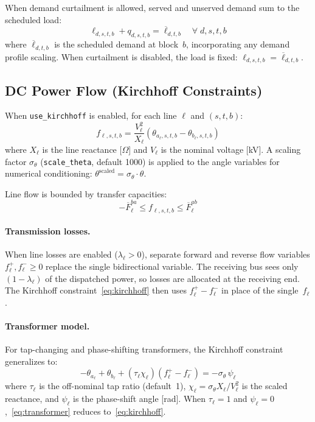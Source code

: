 When demand curtailment is allowed, served and unserved demand sum to the
scheduled load:
\begin{equation}
\label{eq:demand_balance}
\ell_{d,s,t,b} + q_{d,s,t,b} = \overline{\ell}_{d,t,b}
\quad \forall\; d, s, t, b
\end{equation}
where $\overline{\ell}_{d,t,b}$ is the scheduled demand at block~$b$,
incorporating any demand profile scaling.  When curtailment is disabled,
the load is fixed: $\ell_{d,s,t,b} = \overline{\ell}_{d,t,b}$.

\subsection{DC Power Flow (Kirchhoff Constraints)}

When \texttt{use\_kirchhoff} is enabled, for each line $\ell$ and
$(s,t,b)$:
\begin{equation}
\label{eq:kirchhoff}
f_{\ell,s,t,b} = \frac{V_\ell^2}{X_\ell}
  \left(\theta_{a_\ell,s,t,b} - \theta_{b_\ell,s,t,b}\right)
\end{equation}
where $X_\ell$ is the line reactance [$\Omega$] and $V_\ell$ is the
nominal voltage [kV].  A scaling factor $\sigma_\theta$
(\texttt{scale\_theta}, default 1000) is applied to the angle variables
for numerical conditioning: $\theta^\text{scaled} = \sigma_\theta \cdot
\theta$.

Line flow is bounded by transfer capacities:
\begin{equation}
-\overline{F}^{ba}_\ell \leq f_{\ell,s,t,b}
  \leq \overline{F}^{ab}_\ell
\end{equation}

\paragraph{Transmission losses.}
When line losses are enabled ($\lambda_\ell > 0$), separate forward and
reverse flow variables $f^+_\ell, f^-_\ell \geq 0$ replace the
single bidirectional variable.  The receiving bus sees only
$(1-\lambda_\ell)$ of the dispatched power, so losses are allocated at
the receiving end.  The Kirchhoff constraint~\eqref{eq:kirchhoff} then
uses $f^+_\ell - f^-_\ell$ in place of the single~$f_\ell$.

\paragraph{Transformer model.}
For tap-changing and phase-shifting transformers, the Kirchhoff
constraint generalizes to:
\begin{equation}
\label{eq:transformer}
-\theta_{a_\ell} + \theta_{b_\ell}
  + (\tau_\ell \chi_\ell)(f^+_\ell - f^-_\ell)
  = -\sigma_\theta \, \psi_{\ell}
\end{equation}
where $\tau_\ell$ is the off-nominal tap ratio (default~1),
$\chi_\ell = \sigma_\theta X_\ell / V_\ell^2$ is the scaled reactance,
and $\psi_\ell$ is the phase-shift angle [rad].
When $\tau_\ell = 1$ and $\psi_\ell = 0$,~\eqref{eq:transformer}
reduces to~\eqref{eq:kirchhoff}.

